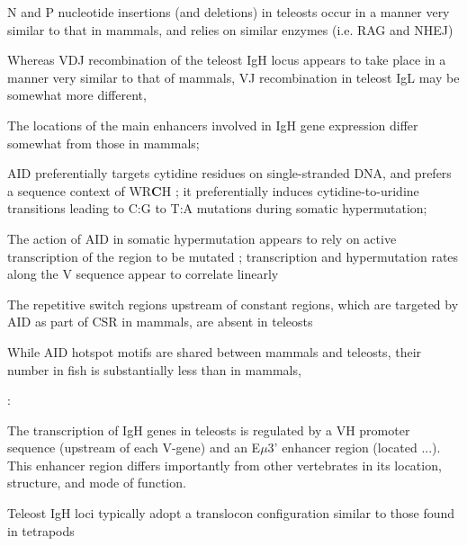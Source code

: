 N and P nucleotide insertions (and deletions) in teleosts occur in a manner very similar to that in mammals, and relies on similar enzymes (i.e. RAG and NHEJ)

Whereas VDJ recombination of the teleost IgH locus appears to take place in a manner very similar to that of mammals, VJ recombination in teleost IgL may be somewhat more different, %

The locations of the main enhancers involved in IgH gene expression differ somewhat from those in mammals; %

AID preferentially targets cytidine residues on single-stranded DNA, and prefers a sequence context of WR\textbf{C}H %
; it preferentially induces cytidine-to-uridine transitions leading to C:G to T:A mutations during somatic hypermutation; %

The action of AID in somatic hypermutation appears to rely on active transcription of the region to be mutated%
; transcription and hypermutation rates along the V sequence appear to correlate linearly %

The repetitive switch regions upstream of constant regions, which are targeted by AID as part of CSR in mammals, are absent in teleosts %

While AID hotspot motifs are shared between mammals and teleosts, their number in fish is substantially less than in mammals, %

\citep{hikima2011ig}:

The transcription of IgH genes in teleosts is regulated by a VH promoter sequence (upstream of each V-gene) and an E$\mu$3' enhancer region (located ...). This enhancer region differs importantly from other vertebrates in its location, structure, and mode of function.

Teleost IgH loci typically adopt a translocon configuration similar to those found in tetrapods%

